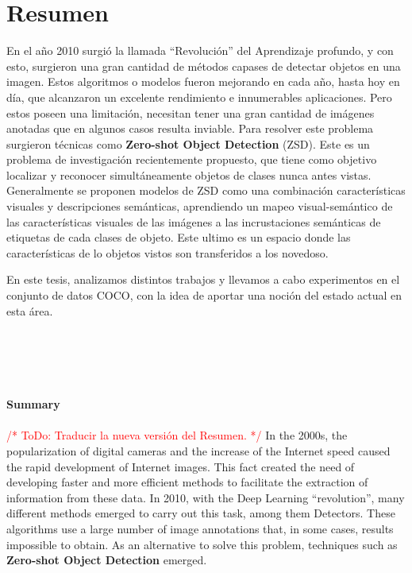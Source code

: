 \documentclass[12pt,twosided]{book}
\begin{document}
\chapter*{Resumen}

\pagestyle{plain}

En el año 2010 surgió la llamada ``Revolución'' del Aprendizaje profundo, y con esto, surgieron una gran cantidad de métodos capases de detectar objetos en una imagen. Estos algoritmos o modelos fueron mejorando en cada año, hasta hoy en día, que alcanzaron un excelente rendimiento e innumerables aplicaciones. Pero estos poseen una limitación, necesitan tener una gran cantidad de imágenes anotadas que en algunos casos resulta inviable. Para resolver este problema surgieron técnicas como \textbf{Zero-shot Object Detection} (ZSD). Este es un problema de investigación recientemente propuesto, que tiene como objetivo localizar y reconocer simultáneamente objetos de clases nunca antes vistas. Generalmente se proponen modelos de ZSD como una combinación características visuales y descripciones semánticas, aprendiendo un mapeo visual-semántico de las características visuales de las imágenes a las incrustaciones semánticas de etiquetas de cada clases de objeto. Este ultimo es un espacio donde las características de lo objetos vistos son transferidos a los novedoso.

En este tesis, analizamos distintos trabajos y llevamos a cabo experimentos en el conjunto de datos COCO, con la idea de aportar una noción del estado actual en esta área. \\\\\\\\\\\\
{\huge\textbf{Summary}}\\\\

\textcolor{red}{/* ToDo: Traducir la nueva versión del Resumen. */}
In the 2000s, the popularization of digital cameras and the increase of the Internet speed caused the rapid development of Internet images. This fact created the need of developing faster and more efficient methods to facilitate the extraction of information from these data. In 2010, with the Deep Learning ``revolution'', many different methods emerged to carry out this task, among them Detectors. These algorithms use a large number of image annotations that, in some cases, results impossible to obtain. As an alternative to solve this problem, techniques such as \textbf{Zero-shot Object Detection} emerged. 
\end{document}
